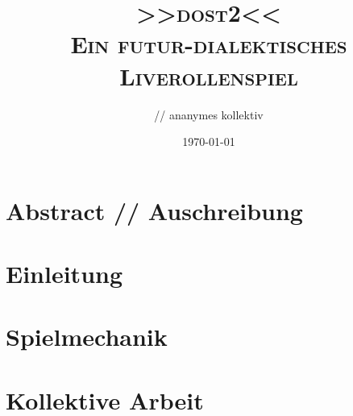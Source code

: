 \documentclass[12pt, a4paper, openany]{book}
\title{
  { \Large 
    \textbf{\textsc{>>\acs{dost2}<<}}\\
  }
  \vspace{0.4cm}
  { \large \color{gray}
    \textsc{Ein futur-dialektisches Liverollenspiel}
  }
}
\author{\creators // ananymes kollektiv}
\date{{\small \today}}
\begin{document}
\frontmatter

\begingroup
  \hypersetup{hidelinks}
  \maketitle
\endgroup

\chapter*{Abstract // Auschreibung}


\begingroup
  \hypersetup{hidelinks}
  \tableofcontents
\endgroup



\mainmatter
\chapter{Einleitung}


\chapter{Spielmechanik}


\chapter{Kollektive Arbeit}

\end{document}
